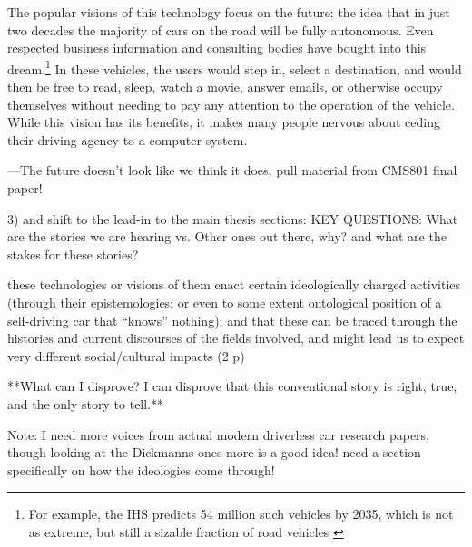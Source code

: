 The popular visions of this technology focus on the future: the
idea that in just two decades the majority of cars on the road will be
fully autonomous. Even respected business information and consulting
bodies have bought into this dream.\footnote{For example, the IHS
  predicts 54 million such vehicles by 2035, which is not as extreme,
  but still a sizable fraction of road vehicles \cite{IHSstudy}} In these vehicles, the users would
step in, select a destination, and would then be free to read, sleep,
watch a movie, answer emails, or otherwise occupy themselves without
needing to pay any attention to the operation of the vehicle. While this
vision has its benefits, it makes many people nervous about
ceding their driving agency to a computer system.\cite{clytton}



---The future doesn't look like we think it does, pull material from
CMS801 final paper! 



3) and shift to the lead-in to the main thesis sections: 
KEY QUESTIONS: What are the stories we are hearing vs. Other ones out
there, why? and what are the stakes for these stories?

these technologies or visions of them enact certain ideologically charged
activities (through their epistemologies; or even to some extent
ontological position of a self-driving car that ``knows'' nothing);
and that these can be traced through the histories and current
discourses of the fields involved, and might lead us to expect very
different social/cultural impacts (2 p)

**What can I disprove?
I can disprove that this conventional story is right, true, and the
only story to tell.**

Note: I need more voices from actual modern driverless car research
papers, though looking at the Dickmanns ones more is a good idea! need
a section specifically on how the ideologies come through!

